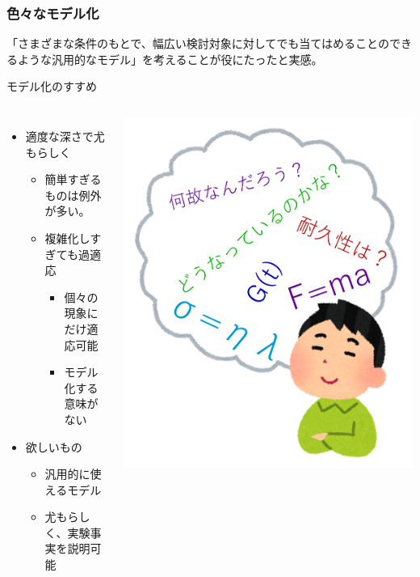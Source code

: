 \documentclass[unicode,12pt]{beamer}%
\begin{document}
\begin{frame}
	\frametitle{色々なモデル化}
	「さまざまな条件のもとで、幅広い検討対象に対してでも当てはめることのできるような汎用的なモデル」を考えることが役にたったと実感。
	\begin{exampleblock}{モデル化のすすめ}
		\begin{columns}[c, onlytextwidth]
			\begin{itemize}
				\item 適度な深さで尤もらしく
					\begin{itemize}
						\item 簡単すぎるものは例外が多い。
						\item 複雑化しすぎても過適応
							\begin{itemize}
								\item 個々の現象にだけ適応可能
								\item モデル化する意味がない
							\end{itemize}
					\end{itemize}
				\item 欲しいもの
					\begin{itemize}
						\item 汎用的に使えるモデル
						\item 尤もらしく、実験事実を説明可能
					\end{itemize}
			\end{itemize}
					\centering
						\includegraphics[width=\textwidth]{souzou.png}
		\end{columns}
	\end{exampleblock}
\end{frame}
\end{document}
